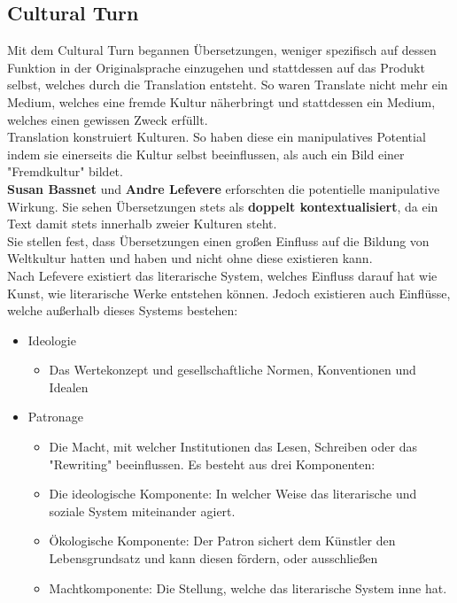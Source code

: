 \documentclass{article}
\begin{document}
	\subsection{Cultural Turn}
	Mit dem Cultural Turn begannen Übersetzungen, weniger spezifisch auf dessen Funktion in der Originalsprache einzugehen und stattdessen auf das Produkt selbst, welches durch die Translation entsteht. So waren Translate nicht mehr ein Medium, welches eine fremde Kultur näherbringt und stattdessen ein Medium, welches einen gewissen Zweck erfüllt. \\
	Translation konstruiert Kulturen. So haben diese ein manipulatives Potential indem sie einerseits die Kultur selbst beeinflussen, als auch ein Bild einer "Fremdkultur" bildet. \\
	\textbf{Susan Bassnet} und \textbf{Andre Lefevere} erforschten die potentielle manipulative Wirkung. Sie sehen Übersetzungen stets als \textbf{doppelt kontextualisiert}, da ein Text damit stets innerhalb zweier Kulturen steht. \\
	Sie stellen fest, dass Übersetzungen einen großen Einfluss auf die Bildung von Weltkultur hatten und haben und nicht ohne diese existieren kann. \\
	Nach Lefevere existiert das literarische System, welches Einfluss darauf hat wie Kunst, wie literarische Werke entstehen können. Jedoch existieren auch Einflüsse, welche außerhalb dieses Systems bestehen:
	\begin{itemize}
		\item{Ideologie}
		\begin{itemize}
			\item{Das Wertekonzept und gesellschaftliche Normen, Konventionen und Idealen}
		\end{itemize}
		\item{Patronage}
		\begin{itemize}
			\item{Die Macht, mit welcher Institutionen das Lesen, Schreiben oder das "Rewriting" beeinflussen. Es besteht aus drei Komponenten:}
			\item{Die ideologische Komponente: In welcher Weise das literarische und soziale System miteinander agiert.}
			\item{Ökologische Komponente: Der Patron sichert dem Künstler den Lebensgrundsatz und kann diesen fördern, oder ausschließen}
			\item{Machtkomponente: Die Stellung, welche das literarische System inne hat.}
		\end{itemize}
	\end{itemize}
\end{document}
